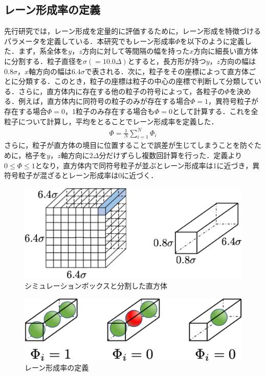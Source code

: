 \subsection{レーン形成率の定義}
%
\par 先行研究では，レーン形成を定量的に評価するために，レーン形成を特徴づけるパラメータを定義している．本研究でもレーン形成率$\Phi$を以下のように定義した．まず，系全体を$y$，$z$方向に対して等間隔の幅を持った$x$方向に細長い直方体に分割する．粒子直径を$\sigma(=10.0\Delta)$とすると，長方形が持つ$y$，$z$方向の幅は$0.8\sigma$，$x$軸方向の幅は$6.4\sigma$で表される．次に，粒子をその座標によって直方体ごとに分類する．このとき，粒子の座標は粒子の中心の座標で判断して分類している．さらに，直方体内に存在する他の粒子の符号によって，各粒子の$\Phi$を決める．例えば，直方体内に同符号の粒子のみが存在する場合$\Phi=1$，異符号粒子が存在する場合$\Phi=0$，1粒子のみ存在する場合も$\Phi=0$として計算する．これを全粒子について計算し，平均をとることでレーン形成率を定義した．
%
\begin{eqnarray}
	\Phi = \frac{1}{N} \sum_{i=1}^N \Phi_i
\end{eqnarray}
%
さらに，粒子が直方体の境目に位置することで誤差が生じてしまうことを防ぐために，格子を$y$，$z$軸方向に$2\Delta$分だけずらし複数回計算を行った．定義より$0\le\Phi\le1$となり，直方体内で同符号粒子が並ぶとレーン形成率は1に近づき，異符号粒子が混ざるとレーン形成率は0に近づく．
%
\begin{figure}[H]
\centering
\includegraphics[scale = 0.7]{figures/box1.pdf}
\caption{シミュレーションボックスと分割した直方体}
\end{figure}
%	
%
\begin{figure}[H]
\centering
\includegraphics[scale = 0.7]{figures/box2.pdf}
\caption{レーン形成率の定義}
\end{figure}
%	
%
%
%
%
